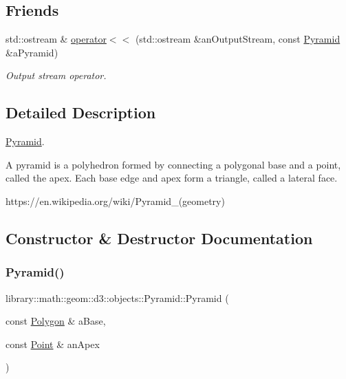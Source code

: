 \subsection*{Friends}
\begin{DoxyCompactItemize}
\item 
std\+::ostream \& \hyperlink{classlibrary_1_1math_1_1geom_1_1d3_1_1objects_1_1_pyramid_aca232624b87596ca043f7507c27f4358}{operator$<$$<$} (std\+::ostream \&an\+Output\+Stream, const \hyperlink{classlibrary_1_1math_1_1geom_1_1d3_1_1objects_1_1_pyramid}{Pyramid} \&a\+Pyramid)
\begin{DoxyCompactList}\small\item\em Output stream operator. \end{DoxyCompactList}\end{DoxyCompactItemize}


\subsection{Detailed Description}
\hyperlink{classlibrary_1_1math_1_1geom_1_1d3_1_1objects_1_1_pyramid}{Pyramid}. 

A pyramid is a polyhedron formed by connecting a polygonal base and a point, called the apex. Each base edge and apex form a triangle, called a lateral face.

https\+://en.wikipedia.\+org/wiki/\+Pyramid\+\_\+(geometry) 

\subsection{Constructor \& Destructor Documentation}
\mbox{\label{classlibrary_1_1math_1_1geom_1_1d3_1_1objects_1_1_pyramid_aafaaeed187584040b306b7de7ee57fd4}} 
\subsubsection{\texorpdfstring{Pyramid()}{Pyramid()}}
{\footnotesize\ttfamily library\+::math\+::geom\+::d3\+::objects\+::\+Pyramid\+::\+Pyramid (\begin{DoxyParamCaption}\item[{const \hyperlink{classlibrary_1_1math_1_1geom_1_1d3_1_1objects_1_1_polygon}{Polygon} \&}]{a\+Base,  }\item[{const \hyperlink{classlibrary_1_1math_1_1geom_1_1d3_1_1objects_1_1_point}{Point} \&}]{an\+Apex }\end{DoxyParamCaption})}



